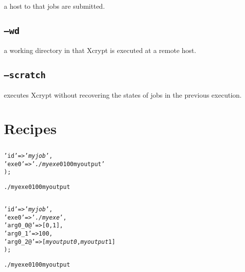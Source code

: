 \documentclass[a4paper,10pt]{report}
\begin{document}
a host to that jobs are submitted.

\section{\texttt{--wd}}

a working directory in that Xcrypt is executed at a remote host.

\section{\texttt{--scratch}}

executes Xcrypt without recovering the states of jobs in the previous
execution.

\appendix

\chapter{Recipes}

\section{}

\begin{boxnote}
\begin{alltt}
%myjob = (
    'id' => '\textit{myjob}',
    'exe0' => '\textit{./myexe} 0 100 myoutput'
);
\end{alltt}
\end{boxnote}

\begin{boxnote}
\begin{alltt}
./myexe 0 100 myoutput
\end{alltt}
\end{boxnote}

\section{}

\begin{boxnote}
\begin{alltt}
%myjob = (
    'id' => '\textit{myjob}',
    'exe0' => '\textit{./myexe}',
    'arg0_0@' => [0,1],
    'arg0_1' => 100,
    'arg0_2@' => [\textit{myoutput0},\textit{myoutput}1]
);
\end{alltt}
\end{boxnote}

\begin{boxnote}
\begin{alltt}
./myexe 0 100 myoutput
\end{alltt}
\end{boxnote}
\end{document}
